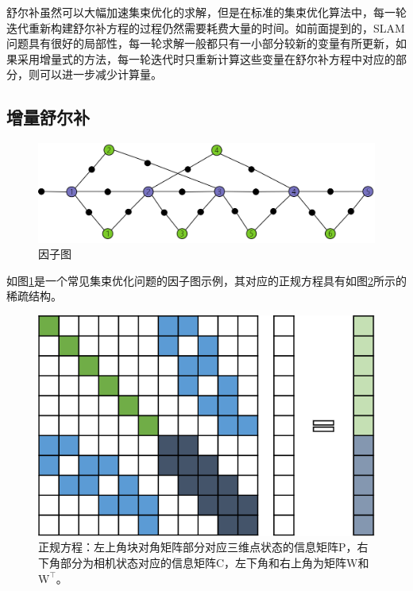 舒尔补虽然可以大幅加速集束优化的求解，但是在标准的集束优化算法中，每一轮迭代重新构建舒尔补方程的过程仍然需要耗费大量的时间。如前面提到的，SLAM问题具有很好的局部性，每一轮求解一般都只有一小部分较新的变量有所更新，如果采用增量式的方法，每一轮迭代时只重新计算这些变量在舒尔补方程中对应的部分，则可以进一步减少计算量。

\subsection{增量舒尔补}

\begin{figure}[htb!]
    \centering
    \includegraphics[width=.8\textwidth]{figs/factor_graph.png}
    \caption{因子图}
    \label{fig:factor_graph}
\end{figure}

如图\ref{fig:factor_graph}是一个常见集束优化问题的因子图示例，其对应的正规方程具有如图\ref{fig:normal_eq}所示的稀疏结构。

\begin{figure}[htb!]
    \centering
    \includegraphics{figs/normal_eq.png}
    \caption{正规方程：左上角块对角矩阵部分对应三维点状态的信息矩阵$\mathrm{P}$，右下角部分为相机状态对应的信息矩阵$\mathrm{C}$，左下角和右上角为矩阵$\mathrm{W}$和$\mathrm{W}^\top$。}
    \label{fig:normal_eq}
\end{figure}

